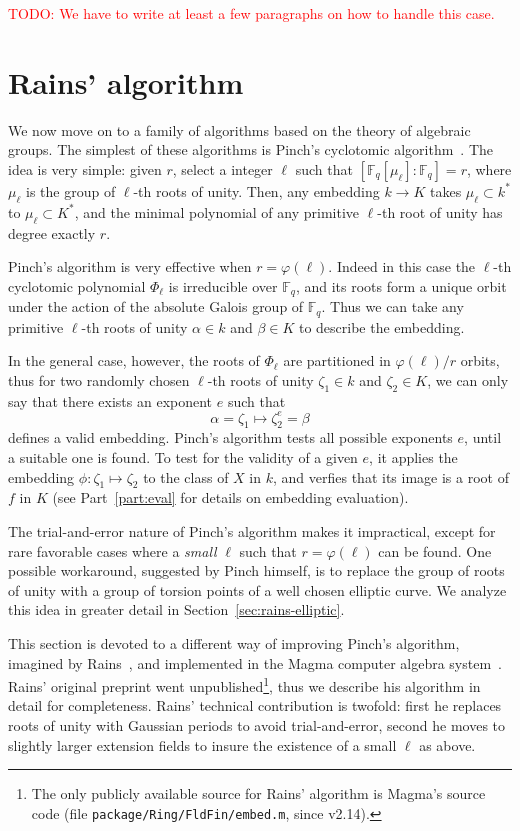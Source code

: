 \documentclass[12pt]{article}
\theoremstyle{plain}
\theoremstyle{definition}
\newcommand{\todo}[1]{\textcolor{red}{TODO: #1}}
\def\F{\ensuremath{\mathbb{F}}}
\def\euler{\ensuremath{\varphi}}
\newcounter{algorithm}
\begin{document}
\todo{We have to write at least a few paragraphs on how to handle this case.}


\section{Rains' algorithm}

We now move on to a family of algorithms based on the theory of
algebraic groups. The simplest of these algorithms is Pinch's
cyclotomic algorithm~\cite{Pinch}. The idea is very simple: given $r$,
select a integer $\ell$ such that $[\F_q[\mu_\ell]:\F_q]=r$, where
$\mu_\ell$ is the group of $\ell$-th roots of unity.  Then, any
embedding $k\to K$ takes $\mu_\ell\subset k^\ast$ to $\mu_\ell\subset
K^\ast$, and the minimal polynomial of any primitive $\ell$-th root of
unity has degree exactly $r$.

Pinch's algorithm is very effective when $r=\euler(\ell)$. Indeed in
this case the $\ell$-th cyclotomic polynomial $\Phi_\ell$ is
irreducible over $\F_q$, and its roots form a unique orbit under the
action of the absolute Galois group of $\F_q$. Thus we can take any
primitive $\ell$-th roots of unity $\alpha\in k$ and $\beta\in K$ to
describe the embedding.

In the general case, however, the roots of $\Phi_\ell$ are partitioned
in $\euler(\ell)/r$ orbits, thus for two randomly chosen $\ell$-th
roots of unity $\zeta_1\in k$ and $\zeta_2\in K$, we can only say that
there exists an exponent $e$ such that
\begin{equation*}
  \alpha = \zeta_1 \mapsto \zeta_2^e = \beta
\end{equation*}
defines a valid embedding. Pinch's algorithm tests all possible
exponents $e$, until a suitable one is found. To test for the validity
of a given $e$, it applies the embedding $\phi:\zeta_1\mapsto\zeta_2$
to the class of $X$ in $k$, and verfies that its image is a root of
$f$ in $K$ (see Part~\ref{part:eval} for details on embedding
evaluation).

The trial-and-error nature of Pinch's algorithm makes it impractical,
except for rare favorable cases where a \emph{small} $\ell$ such that
$r=\euler(\ell)$ can be found. One possible workaround, suggested by
Pinch himself, is to replace the group of roots of unity with a group
of torsion points of a well chosen elliptic curve. We analyze this
idea in greater detail in Section~\ref{sec:rains-elliptic}.

This section is devoted to a different way of improving Pinch's
algorithm, imagined by Rains~\cite{rains2008}, and implemented in the
Magma computer algebra system~\cite{MAGMA}. Rains' original preprint
went unpublished\footnote{The only publicly available source for
  Rains' algorithm is Magma's source code (file
  \texttt{package/Ring/FldFin/embed.m}, since v2.14).}, thus we
describe his algorithm in detail for completeness. Rains' technical
contribution is twofold: first he replaces roots of unity with
Gaussian periods to avoid trial-and-error, second he moves to slightly
larger extension fields to insure the existence of a small $\ell$ as
above.
\end{document}
